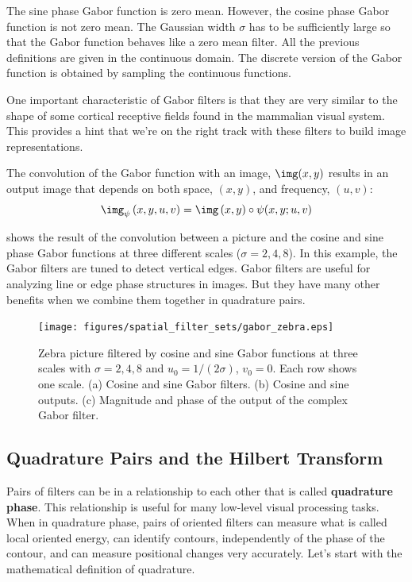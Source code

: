 The sine phase Gabor function is zero mean. However, the cosine phase Gabor function is not zero mean. The Gaussian width $\sigma$ has to be sufficiently large so that the Gabor function behaves like a zero mean filter. All the previous definitions are given in the continuous domain. The discrete version of the Gabor function is obtained by sampling the continuous functions. 

One important characteristic of Gabor filters is that they are very similar to the shape of some cortical receptive fields found in the mammalian visual system. This provides a hint that we're on the right track with these filters to build image representations.     



The convolution of the Gabor function with an image, $\img (x,y)$ results in an output image that depends on both space, $(x,y)$, and frequency, $(u,v)$:
\begin{equation}
\label{eq:gaborconv}
\img_{\psi} \left(x,y,u,v \right) = \img \left(x,y\right) \circ \psi(x,y;u,v) 
\end{equation}


\Fig{\ref{fig:gabor_zebra}} shows the result of the convolution between a picture and the cosine and sine phase Gabor functions at three different scales ($\sigma = 2,4,8$). In this example, the Gabor filters are tuned to detect vertical edges. Gabor filters are useful for analyzing line or edge phase structures in images.  But they have many other benefits when we combine them together in quadrature pairs.


\begin{figure}[t]
\texttt{[image: figures/spatial\_filter\_sets/gabor\_zebra.eps]}
\caption{Zebra picture filtered by cosine and sine Gabor functions at three scales with $\sigma = 2,4,8$ and $u_0 = 1/(2\sigma)$, $v_0=0$. Each row shows one scale. (a) Cosine and sine Gabor filters. (b) Cosine and sine outputs. (c) Magnitude and phase of the output of the complex Gabor filter.} 
\label{fig:gabor_zebra}
\end{figure}

\subsection{Quadrature Pairs and the Hilbert Transform}

Pairs of filters can be in a relationship to each other that is called {\bf quadrature phase}. 
This relationship is useful for many low-level visual processing tasks.  When in quadrature phase, pairs of oriented filters can measure what is called local oriented energy, can identify contours, independently of the phase of the contour, and can measure positional changes very accurately. Let's start with the mathematical definition of quadrature.

